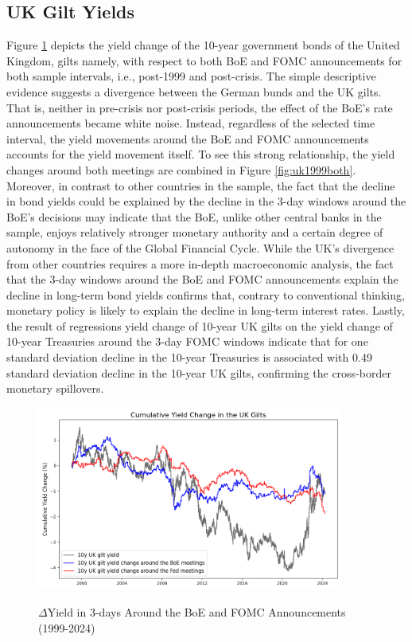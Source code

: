 
\subsection{UK Gilt Yields}

Figure \ref{fig:uk1999} depicts the yield change of the 10-year government bonds of the United Kingdom, gilts namely, with respect to both BoE and FOMC announcements for both sample intervals, i.e., post-1999 and post-crisis. The simple descriptive evidence suggests a divergence between the German bunds and the UK gilts. That is, neither in pre-crisis nor post-crisis periods, the effect of the BoE's rate announcements became white noise. Instead, regardless of the selected time interval, the yield movements around the BoE and FOMC announcements accounts for the yield movement itself. To see this strong relationship, the yield changes around both meetings are combined in Figure \ref{fig:uk1999both}. \\

Moreover, in contrast to other countries in the sample, the fact that the decline in bond yields could be explained by the decline in the 3-day windows around the BoE's decisions may indicate that the BoE, unlike other central banks in the sample, enjoys relatively stronger monetary authority and a certain degree of autonomy in the face of the Global Financial Cycle. While the UK's divergence from other countries requires a more in-depth macroeconomic analysis, the fact that the 3-day windows around the BoE and FOMC announcements explain the decline in long-term bond yields confirms that, contrary to conventional thinking, monetary policy is likely to explain the decline in long-term interest rates. Lastly, the result of regressions yield change of 10-year UK gilts on the yield change of 10-year Treasuries around the 3-day FOMC windows indicate that for one standard deviation decline in the 10-year Treasuries is associated with 0.49 standard deviation decline in the 10-year UK gilts, confirming the cross-border monetary spillovers.

\begin{figure}[!htbp]
    \centering
    \caption{$\Delta$Yield in 3-days Around the BoE and FOMC Announcements (1999-2024)}    \includegraphics[width=0.9\textwidth]{figures/1999_uk_gilts_figure1a.png}
    \label{fig:uk1999}
\end{figure}
\vspace{0.2cm}

